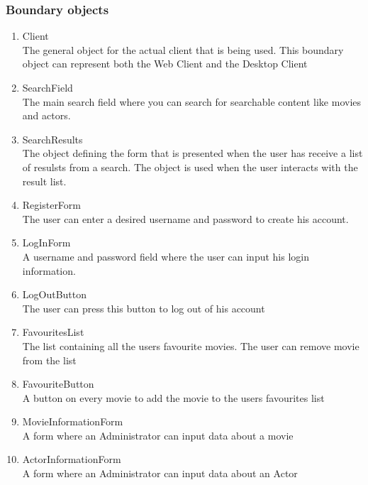 \subsubsection{Boundary objects}

\begin{enumerate}

	\item Client \hfill \\
	The general object for the actual client that is being used. This boundary object can represent both the Web Client and the Desktop Client

	\item SearchField \hfill \\
	The main search field where you can search for searchable content like movies and actors.
	
	\item SearchResults \hfill \\
	The object defining the form that is presented when the user has receive a list of resulsts from a search. The object is used when the user interacts with the result list.
	
	\item RegisterForm \hfill \\
	The user can enter a desired username and password to create his account.

	\item LogInForm \hfill \\
	A username and password field where the user can input his login information.
	
	\item LogOutButton \hfill \\
	The user can press this button to log out of his account
	
	\item FavouritesList \hfill \\
	The list containing all the users favourite movies. The user can remove movie from the list
	
	\item FavouriteButton \hfill \\
	A button on every movie to add the movie to the users favourites list
	
	\item MovieInformationForm \hfill \\
	A form where an Administrator can input data about a movie
	
	\item ActorInformationForm \hfill \\
	A form where an Administrator can input data about an Actor
	
	
\end{enumerate}

